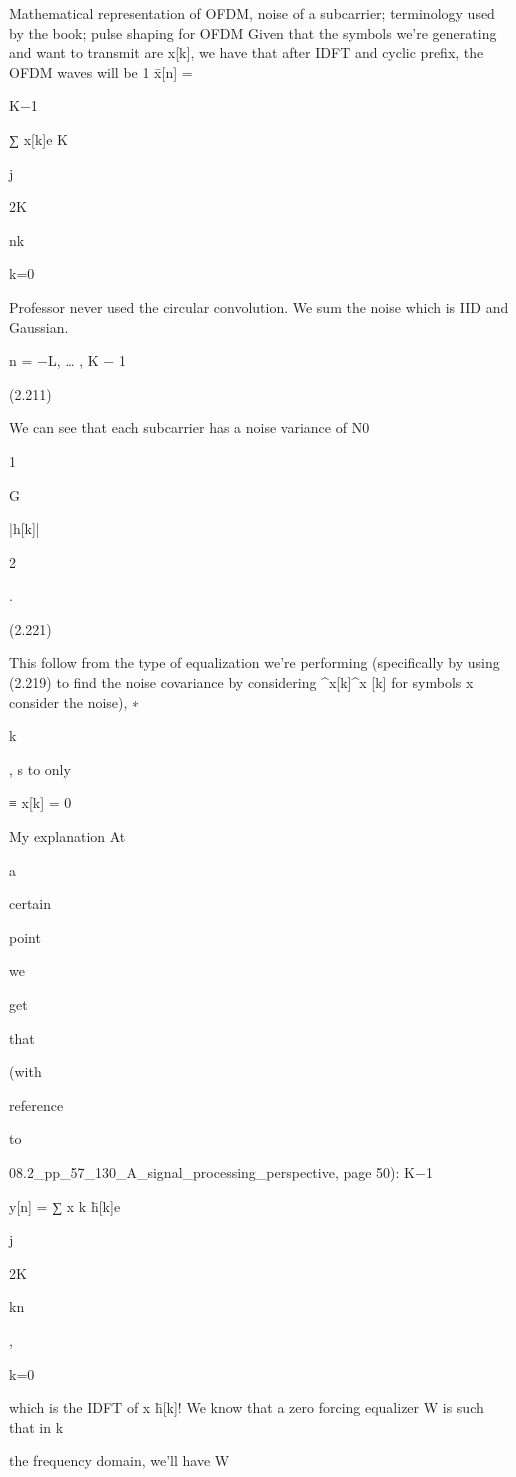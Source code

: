 {{{Mathematical representation of OFDM, noise of a subcarrier;
terminology used by the book; pulse shaping for OFDM Given that the symbols we're generating and want to transmit are x[k], we have that after IDFT and cyclic prefix, the OFDM waves will be 1 x̄[n] =

K−1

∑ x[k]e K

j

2\pi K

nk

k=0

Professor never used the circular convolution.
We sum the noise which is IID and Gaussian.

n = −L, … , K − 1

(2.211)

We can see that each subcarrier has a noise variance of N0

1

G

|h[k]|

2

.

(2.221)

This follow from the type of equalization we're performing (specifically by using (2.219)
to find the noise covariance by considering ^x[k]^x [k] for symbols x consider the noise),
∗

k

, s to only

≡ x[k] = 0

My explanation At

a

certain

point

we

get

that

(with

reference

to

08.2_pp_57_130_A_signal_processing_perspective, page 50):
K−1

y[n] = ∑ x k h̄[k]e

j

2\pi K

kn

,

k=0

which is the IDFT of x h̄[k]! We know that a zero forcing equalizer W is such that in k

the frequency domain, we'll have W

}}}

